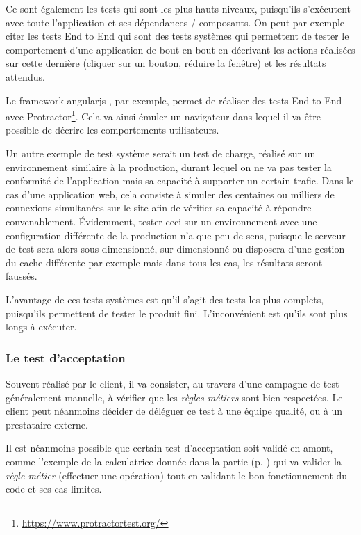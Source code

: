 Ce sont également les tests qui sont les plus hauts niveaux, puisqu'ils s'exécutent avec toute l'application et ses dépendances / composants. On peut par exemple citer les tests End to End qui sont des tests systèmes qui permettent de tester le comportement d'une application de bout en bout en décrivant les actions réalisées sur cette dernière (cliquer sur un bouton, réduire la fenêtre) et les résultats attendus.

Le \gls{framework} \gls{angularjs} , par exemple, permet de réaliser des tests End to End avec Protractor\footnote{\url{https://www.protractortest.org/}}. Cela va ainsi émuler un navigateur dans lequel il va être possible de décrire les comportements utilisateurs. 

Un autre exemple de test système serait un test de charge, réalisé sur un environnement similaire à la production, durant lequel on ne va pas tester la conformité de l'application mais sa capacité à supporter un certain trafic. Dans le cas d'une application web, cela consiste à simuler des centaines ou milliers de connexions simultanées sur le site afin de vérifier sa capacité à répondre convenablement. Évidemment, tester ceci sur un environnement avec une configuration différente de la production n'a que peu de sens, puisque le serveur de test sera alors sous-dimensionné, sur-dimensionné ou disposera d'une gestion du cache différente par exemple mais dans tous les cas, les résultats seront faussés.

L'avantage de ces tests systèmes est qu'il s'agit des tests les plus complets, puisqu'ils permettent de tester le produit fini. L'inconvénient est qu'ils sont plus longs à exécuter.

\subsubsection{Le test d'acceptation}\label{test-acceptation}

Souvent réalisé par le client, il va consister, au travers d'une campagne de test généralement manuelle, à vérifier que les \emph{règles métiers} sont bien respectées. Le client peut néanmoins décider de déléguer ce test à une équipe qualité, ou à un prestataire externe.

Il est néanmoins possible que certain test d'acceptation soit validé en amont, comme l'exemple de la calculatrice donnée dans la partie  (p. \pageref{test-composant}) qui va valider la \emph{règle métier} (effectuer une opération) tout en validant le bon fonctionnement du code et ses cas limites.

